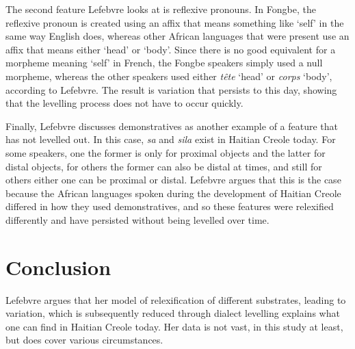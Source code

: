 \documentclass{article}
\newcommand{\lexi}[1]{\textit{#1}}
\newcommand{\gloss}[1]{`#1'}
\begin{document}
      The second feature Lefebvre looks at is reflexive pronouns.
      In Fongbe, the reflexive pronoun is created using an affix that means something like \gloss{self} in the same way English does, whereas other African languages that were present use an affix that means either \gloss{head} or \gloss{body}.
      Since there is no good equivalent for a morpheme meaning \gloss{self} in French, the Fongbe speakers simply used a null morpheme, whereas the other speakers used either \lexi{tête} \gloss{head} or \lexi{corps} \gloss{body}, according to Lefebvre.
      The result is variation that persists to this day, showing that the levelling process does not have to occur quickly.

      Finally, Lefebvre discusses demonstratives as another example of a feature that has not levelled out.
      In this case, \lexi{sa} and \lexi{sila} exist in Haitian Creole today.
      For some speakers, one the former is only for proximal objects and the latter for distal objects, for others the former can also be distal at times, and still for others either one can be proximal or distal.
      Lefebvre argues that this is the case because the African languages spoken during the development of Haitian Creole differed in how they used demonstratives, and so these features were relexified differently and have persisted without being levelled over time.

    \section{Conclusion}
      Lefebvre argues that her model of relexification of different substrates, leading to variation, which is subsequently reduced through dialect levelling explains what one can find in Haitian Creole today.
      Her data is not vast, in this study at least, but does cover various circumstances.

    \printbibliography
\end{document}
